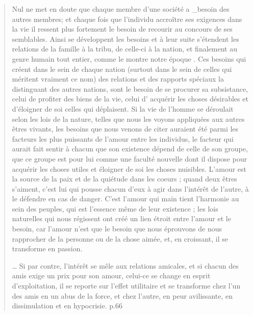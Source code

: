 \begin{quote}
    Nul ne met en doute que chaque membre d'une société a _besoin
des autres membres; et chaque fois que l'individu accroître ses exigences
dans la vie il ressent plus fortement le besoin de recourir au concours
de ses semblables. Ainsi se développent les besoins et à leur suite s'étendent
les relations de la famille à la tribu, de celle-ci à la nation, et finalement
au genre humain tout entier, comme le montre notre époque . Ces
besoins qui créent dans le sein de chaque nation (surtout dans le sein de
celles qui méritent vraiment ce nom) des relations et des rapports
spéciaux la distinguant des autres nations, sont le besoin de se procurer
sa subsistance, celui de profiter des biens de la vie, celui d' acquérir
les choses désirables et d'éloigner de soi celles qui déplaisent. 
Si la vie de l'homme se déroulait selon les lois de la nature, telles
que nous les voyons appliquées aux autres êtres vivants, les besoins
que nous venons de citer auraient été parmi les facteurs les plus puissants
de l'amour entre les individus, le facteur qui aurait fait sentir à chacun
que son existence dépend de celle de son groupe, que ce groupe est pour lui comme une faculté nouvelle dont il dispose pour acquérir les
choses utiles et éloigner de soi les choses nuisibles. L'amour est la source
de la paix et de la quiétude dans les coeurs ; quand deux êtres s'aiment,
c'est lui qui pousse chacun d'eux à agir dans l'intérêt de l'autre, à le défendre en cas de danger.  C'est l'amour qui main tient l'harmonie au
sein des peuples, qui est l'essence même de leur existence ; les lois naturelles qui nous régissent ont créé un lien étroit entre l'amour et le besoin,
car l'amour n'est que le besoin que nous éprouvons de nous rapprocher de la personne ou de la chose aimée, et, en croissant, il se transforme en passion.

\ldots
Si par contre, l'intérêt se mêle aux relations amicales, et si chacun des amis exige un prix pour son amour, celui-ce se change en esprit d'exploitation, il se reporte sur l'effet utilitaire et se transforme chez l'un des amis en un abus de la force, et chez l'autre, en peur avilissante, en dissimulation et en hypocrisie.
p.66
\end{quote}

